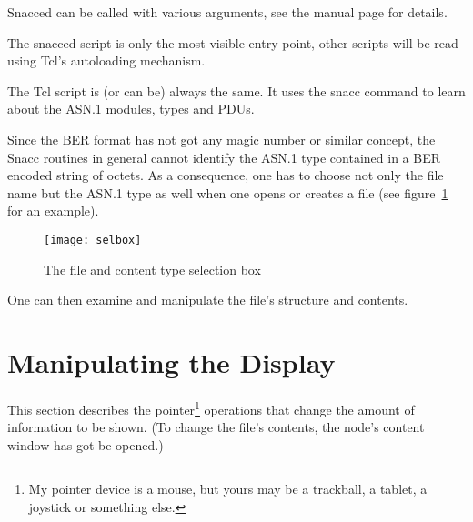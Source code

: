 Snacced can be called with various arguments, see the manual page for details.

The {\ufn snacced} script is only the most visible entry point, other scripts will be read using Tcl's autoloading mechanism.

The Tcl script is (or can be) always the same.
It uses the {\Tcl snacc} command to learn about the ASN.1 modules, types and PDUs.

Since the BER format has not got any magic number or similar concept, the Snacc routines in general cannot identify the ASN.1 type contained in a BER encoded string of octets.
As a consequence, one has to choose not only the file name but the ASN.1 type as well when one opens or creates a file (see figure~\ref{selbox-pic}  for an example).

\begin{figure}[ht]
\begin{center}
\texttt{[image: selbox]}
\caption{The file and content type selection box}
\label{selbox-pic}
\end{center}
\end{figure}

One can then examine and manipulate the file's structure and contents.

\section{Manipulating the Display}

This section describes the pointer\footnote{
  My pointer device is a mouse, but yours may be a trackball, a tablet, a joystick or something else.
} operations that change the amount of information to be shown.
(To change the file's contents, the node's content window has got be opened.)

